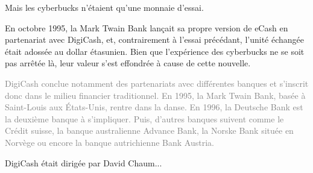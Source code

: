 Mais les cyberbucks n'étaient qu'une monnaie d'essai.

En octobre 1995, la Mark Twain Bank lançait sa propre version de eCash en partenariat avec DigiCash, et, contrairement à l'essai précédant, l'unité échangée était adossée au dollar étasunien. Bien que l'expérience des cyberbucks ne se soit pas arrêtée là, leur valeur s'est effondrée à cause de cette nouvelle. %

\textcolor{gray}{DigiCash conclue notamment des partenariats avec différentes banques et s'inscrit donc dans le milieu financier traditionnel. En 1995, la Mark Twain Bank, basée à Saint-Louis aux États-Unis, rentre dans la danse. En 1996, la Deutsche Bank est la deuxième banque à s'impliquer. Puis, d'autres banques suivent comme le Crédit suisse, la banque australienne Advance Bank, la Norske Bank située en Norvège ou encore la banque autrichienne Bank Austria.}

DigiCash était dirigée par David Chaum...

